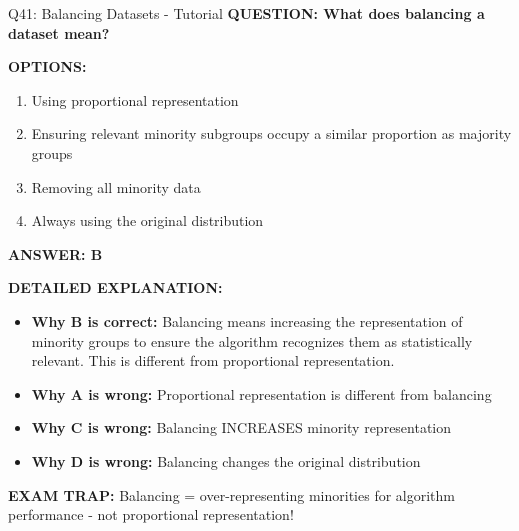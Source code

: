 \documentclass[8pt]{beamer}
\begin{document}
	\begin{frame}{Q41: Balancing Datasets - Tutorial}
		\fontsize{6.5}{7.5}\selectfont
		\textbf{QUESTION: What does balancing a dataset mean?}
		
		\vspace{0.1cm}
		\textbf{OPTIONS:}
		\begin{enumerate}
			\item Using proportional representation
			\item Ensuring relevant minority subgroups occupy a similar proportion as majority groups
			\item Removing all minority data
			\item Always using the original distribution
		\end{enumerate}
		
		\vspace{0.1cm}
		\textcolor{myblue}{\textbf{ANSWER: B}}
		
		\vspace{0.1cm}
		\textbf{DETAILED EXPLANATION:}
		\begin{itemize}
			\item \textbf{Why B is correct:} Balancing means increasing the representation of minority groups to ensure the algorithm recognizes them as statistically relevant. This is different from proportional representation.
			\item \textbf{Why A is wrong:} Proportional representation is different from balancing
			\item \textbf{Why C is wrong:} Balancing INCREASES minority representation
			\item \textbf{Why D is wrong:} Balancing changes the original distribution
		\end{itemize}
		
		\textcolor{myred}{\textbf{EXAM TRAP:}} Balancing = \textcolor{myblue}{over-representing minorities} for algorithm performance - not proportional representation!
	\end{frame}
	
\end{document}
